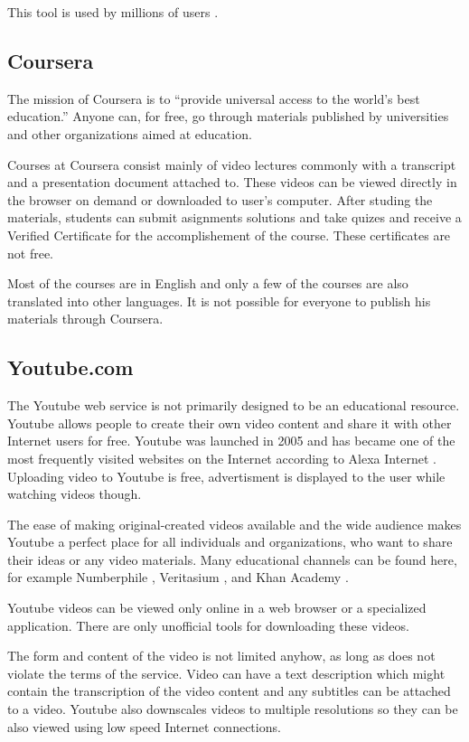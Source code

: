 This tool is used by millions of users \cite{8}.

\subsection{Coursera}
The mission of Coursera is to ``provide universal access to the world’s best education.'' \cite{9} Anyone can, for free, go through materials published by universities and other organizations aimed at education.

Courses at Coursera consist mainly of video lectures commonly with a transcript and a presentation document attached to. These videos can be viewed directly in the browser on demand or downloaded to user's computer. After studing the materials, students can submit asignments solutions and take quizes and receive a Verified Certificate for the accomplishement of the course. These certificates are not free.

Most of the courses are in English and only a few of the courses are also translated into other languages. It is not possible for everyone to publish his materials through Coursera.

\subsection{Youtube.com}
The Youtube web service \cite{10} is not primarily designed to be an educational resource. Youtube allows people to create their own video content and share it with other Internet users for free. Youtube was launched in 2005 and has became one of the most frequently visited websites on the Internet according to Alexa Internet \cite{11}. Uploading video to Youtube is free, advertisment is displayed to the user while watching videos though.

The ease of making original-created videos available and the wide audience makes Youtube a perfect place for all individuals and organizations, who want to share their ideas or any video materials. Many educational channels can be found here, for example Numberphile \cite{12}, Veritasium \cite{13}, and Khan Academy \cite{14}.

Youtube videos can be viewed only online in a web browser or a specialized application. There are only unofficial tools for downloading these videos.

The form and content of the video is not limited anyhow, as long as does not violate the terms of the service. Video can have a text description which might contain the transcription of the video content and any subtitles can be attached to a video. Youtube also downscales videos to multiple resolutions so they can be also viewed using low speed Internet connections.

